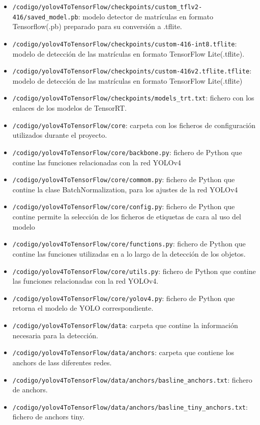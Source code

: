 \begin{itemize}
    \item \texttt{/codigo/yolov4ToTensorFlow/checkpoints/custom\_tflv2-416/saved\_model.pb}: modelo detector de matrículas en formato Tensorflow(.pb) preparado para su conversión a .tflite.
    \item \texttt{/codigo/yolov4ToTensorFlow/checkpoints/custom-416-int8.tflite}: modelo de detección de las matrículas en formato TensorFlow Lite(.tflite).
    \item \texttt{/codigo/yolov4ToTensorFlow/checkpoints/custom-416v2.tflite.tflite}: modelo de detección de las matrículas en formato TensorFlow Lite(.tflite)
    \item \texttt{/codigo/yolov4ToTensorFlow/checkpoints/models\_trt.txt}: fichero con los enlaces de los modelos de TensorRT.
    \item \texttt{/codigo/yolov4ToTensorFlow/core}: carpeta con los ficheros de configuración utilizados durante el proyecto.
    \item \texttt{/codigo/yolov4ToTensorFlow/core/backbone.py}: fichero de Python que contine las funciones relacionadas con la red YOLOv4
    \item \texttt{/codigo/yolov4ToTensorFlow/core/commom.py}: fichero de Python que contine la clase BatchNormalization, para los ajustes de la red YOLOv4
    \item \texttt{/codigo/yolov4ToTensorFlow/core/config.py}: fichero de Python que contine permite la selección de los ficheros de etiquetas de cara al uso del modelo
    \item \texttt{/codigo/yolov4ToTensorFlow/core/functions.py}: fichero de Python que contine las funciones utilizadas en a lo largo de la detección de los objetos.
    \item \texttt{/codigo/yolov4ToTensorFlow/core/utils.py}: fichero de Python que contine las funciones relacionadas con la red YOLOv4.
    \item \texttt{/codigo/yolov4ToTensorFlow/core/yolov4.py}: fichero de Python que retorna el modelo de YOLO correspondiente.
    \item \texttt{/codigo/yolov4ToTensorFlow/data}: carpeta que contine la información necesaria para la detección.
    \item \texttt{/codigo/yolov4ToTensorFlow/data/anchors}: carpeta que contiene los anchors de lass diferentes redes.
    \item \texttt{/codigo/yolov4ToTensorFlow/data/anchors/basline\_anchors.txt}: fichero de anchors.
    \item \texttt{/codigo/yolov4ToTensorFlow/data/anchors/basline\_tiny\_anchors.txt}: fichero de anchors tiny.

\end{itemize}
